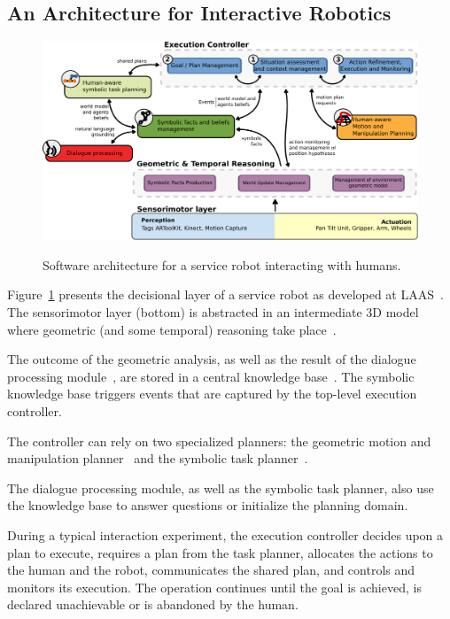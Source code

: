 \documentclass{svmult}
\begin{document}

\subsection{An Architecture for Interactive Robotics}
 
\begin{figure}[thpb]
  \centering
  \includegraphics[width=1.0\textwidth]{./figs/architecture-overview.pdf} \\
  \caption {Software architecture for a service robot interacting with humans.}
  \label{fig|archi}
\end{figure}

Figure~\ref{fig|archi} presents the decisional layer of a service robot as
developed at LAAS~\cite{Alami2011}. The sensorimotor layer (bottom) is
abstracted in an intermediate 3D model where geometric (and some temporal)
reasoning take place~\cite{Sisbot2011}.

The outcome of the geometric analysis, as well as the result of the dialogue
processing module~\cite{Lemaignan2011a}, are stored in a central knowledge
base~\cite{Lemaignan2010}. The symbolic knowledge base triggers events that are
captured by the top-level execution controller.

The controller can rely on two specialized planners: the geometric motion and
manipulation planner~\cite{Sisbot2008, Mainprice2011, Pandey2010} and the
symbolic task planner~\cite{Alili2008}.

The dialogue processing module, as well as the symbolic task planner, also
use the knowledge base to answer questions or initialize the planning domain.

During a typical interaction experiment, the execution controller decides upon a
plan to execute, requires a plan from the task planner, allocates the actions to
the human and the robot, communicates the shared plan, and controls and
monitors its execution. The operation continues until the goal is achieved, is
declared unachievable or is abandoned by the human.
\end{document}

